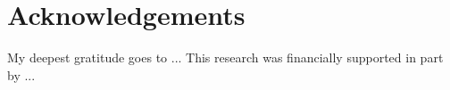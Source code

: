 \chapter*{Acknowledgements}
\thispagestyle{plain}

My deepest gratitude goes to ... This research was financially supported in part by ...